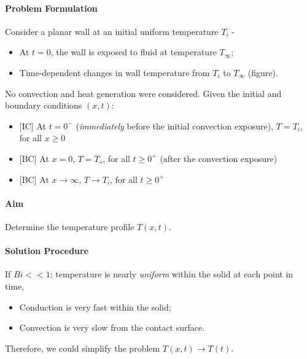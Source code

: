 \documentclass[12pt, a4paper]{article}
\begin{document}
\paragraph{Problem Formulation} Consider a planar wall at an initial uniform temperature $T_i$ -
\begin{itemize}
    \item At $t = 0$, the wall is exposed to fluid at temperature $T_\infty$;
    \item Time-dependent changes in wall temperature from $T_i$ to $T_\infty$ (figure).
\end{itemize}
No convection and heat generation were considered. 
Given the initial and boundary conditions $(x, t)$:
\begin{itemize}
    \item {\color{gray}[IC]} At $t=0^-$ (\textit{immediately} before the initial convection exposure), $T = T_i$, for all $x \geq 0$
    \item {\color{gray}[BC]} At $x=0$, $T = T_s$, for all $t \geq 0^+$ (after the convection exposure)
    \item {\color{gray}[BC]} At $x \to \infty$, $T \to T_i$, for all $t \geq 0^+$
\end{itemize}

\paragraph{Aim} Determine the temperature profile $T(x, t)$.

\paragraph{Solution Procedure}
If $Bi << 1$: temperature is nearly \textit{uniform} within the solid at each point in time,
\begin{itemize}
    \item Conduction is very fast within the solid;
    \item Convection is very slow from the contact surface.
\end{itemize}
Therefore, we could simplify the problem $T(x, t) \to T(t)$.\\
\end{document}
